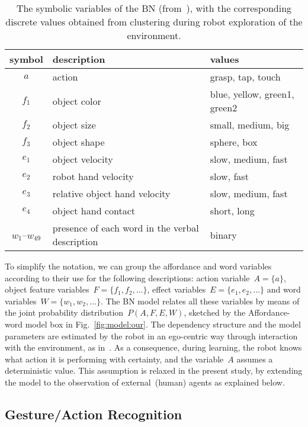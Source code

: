 \begin{table}
    \centering
    \caption{The symbolic variables of the \acl{BN} (from~\cite{salvi:2012:smcb}), with the corresponding discrete values obtained from clustering during robot exploration of the environment.}
    \label{tab:bnsymb}
    \begin{tabular}{cp{3.3cm}l}
    \toprule
    symbol & description     & values \\
    \midrule
    $a$ & action          & grasp, tap, touch \\
    \midrule
    $f_1$ & object color   & blue, yellow, green1, green2 \\
    $f_2$ & object size     & small, medium, big \\
    $f_3$ & object shape    & sphere, box \\
    \midrule
    $e_1$ & object velocity & slow, medium, fast \\
    $e_2$ & robot hand velocity & slow, fast \\
    $e_3$ & relative object hand velocity & slow, medium, fast \\
    $e_4$ & object hand contact & short, long \\
    \midrule
    $w_1$--$w_{49}$ & presence of each word in the verbal description & binary \\
    \bottomrule
    \end{tabular}
\end{table}

To simplify the notation, we can group the affordance and word variables according to their use for the following descriptions: action variable~$A = \{a\}$, object feature variables~$F=\{f_1, f_2, \dots\}$, effect variables~$E=\{e_1, e_2, \dots\}$ and word variables~$W = \{w_1, w_2, \dots\}$.
The \ac{BN} model relates all these variables by means of the joint probability distribution~$P(A, F, E, W)$, sketched by the Affordance-word model box in Fig.~\ref{fig:model:our}.
The dependency structure and the model parameters are estimated by the robot in an ego-centric way through interaction with the environment, as in~\cite{salvi:2012:smcb}.
As a consequence, during learning, the robot knows what action it is performing with certainty, and the variable~$A$ assumes a deterministic value. This assumption is relaxed in the present study, by extending the model to the observation of external~(human) agents as explained below.

\subsection{Gesture/Action Recognition}

